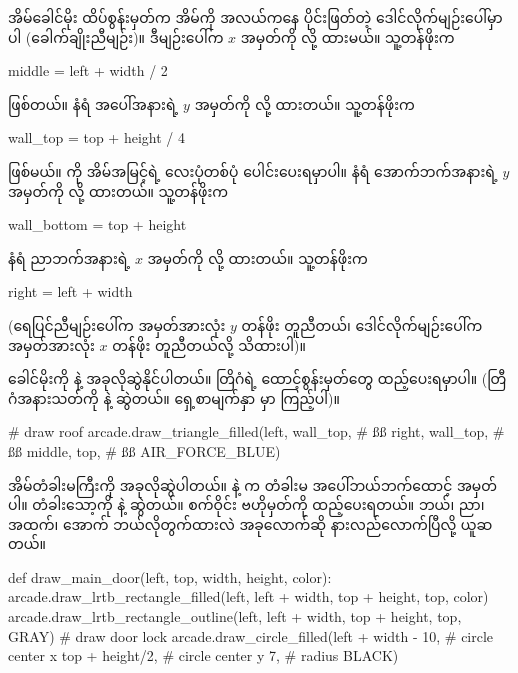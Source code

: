 %
အိမ်ခေါင်မိုး ထိပ်စွန်းမှတ်က အိမ်ကို အလယ်ကနေ ပိုင်းဖြတ်တဲ့ ဒေါင်လိုက်မျဉ်းပေါ်မှာပါ (ခေါက်ချိုးညီမျဉ်း)။ ဒီမျဉ်းပေါ်က $x$ အမှတ်ကို  လို့ ထားမယ်။  သူ့တန်ဖိုးက
\begin{codetxt}
middle = left + width / 2
\end{codetxt}
ဖြစ်တယ်။ နံရံ အပေါ်အနားရဲ့ $y$ အမှတ်ကို  လို့ ထားတယ်။ သူ့တန်ဖိုးက
\begin{codetxt}
wall_top = top + height / 4
\end{codetxt}
ဖြစ်မယ်။  ကို အိမ်အမြင့်ရဲ့ လေးပုံတစ်ပုံ ပေါင်းပေးရမှာပါ။ နံရံ အောက်ဘက်အနားရဲ့ $y$ အမှတ်ကို  လို့ ထားတယ်။ သူ့တန်ဖိုးက
\begin{codetxt}
wall_bottom = top + height
\end{codetxt}
နံရံ ညာဘက်အနားရဲ့ $x$ အမှတ်ကို  လို့ ထားတယ်။ သူ့တန်ဖိုးက
\begin{codetxt}
right = left + width
\end{codetxt}
(ရေပြင်ညီမျဉ်းပေါ်က အမှတ်အားလုံး $y$ တန်ဖိုး တူညီတယ်၊ ဒေါင်လိုက်မျဉ်းပေါ်က အမှတ်အားလုံး $x$ တန်ဖိုး တူညီတယ်လို့ သိထားပါ)။

ခေါင်မိုးကို  နဲ့ အခုလိုဆွဲနိုင်ပါတယ်။ တြိဂံရဲ့ ထောင့်စွန်းမှတ်တွေ ထည့်ပေးရမှာပါ။ (တြီဂံအနားသတ်ကို  နဲ့ ဆွဲတယ်။ ရှေ့စာမျက်နှာ  မှာ ကြည့်ပါ)။ 
\begin{py}
# draw roof 
arcade.draw_triangle_filled(left, wall_top,   # ßß
                            right, wall_top,  # ßß 
                            middle, top,      # ßß
                            AIR_FORCE_BLUE)
\end{py}

အိမ်တံခါးမကြီးကို အခုလိုဆွဲပါတယ်။  နဲ့  က တံခါးမ အပေါ်ဘယ်ဘက်ထောင့် အမှတ်ပါ။ တံခါးသော့ကို  နဲ့  ဆွဲတယ်။ စက်ဝိုင်း ဗဟိုမှတ်ကို ထည့်ပေးရတယ်။ ဘယ်၊ ညာ၊ အထက်၊ အောက် ဘယ်လိုတွက်ထားလဲ အခုလောက်ဆို နားလည်လောက်ပြီလို့ ယူဆတယ်။ 
%
\begin{py}
def draw_main_door(left, top, width, height, color):
    arcade.draw_lrtb_rectangle_filled(left, left + width,
                                      top + height, top,
                                      color)
    arcade.draw_lrtb_rectangle_outline(left, left + width,
                                       top + height, top,
                                       GRAY)
    # draw door lock
    arcade.draw_circle_filled(left + width - 10,  # circle center x 
                              top + height/2,     # circle center y
                              7,                  # radius
                              BLACK)
\end{py}
%

